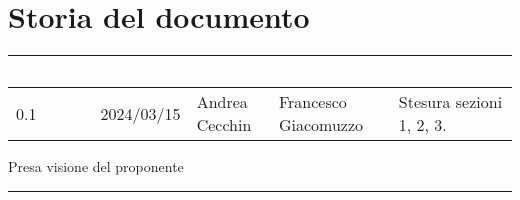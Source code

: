 \section{Storia del documento} \label{sec:storia}
\begingroup
\setlength{\tabcolsep}{10pt}
\renewcommand{\arraystretch}{1.5}
\begin{tabularx}{\textwidth}{| l | l | X | X | X |}
    \hline
    \rowcolor{headerrow} \textbf{\textcolor{white}{Versione}} & \textbf{\textcolor{white}{Data}} & \textbf{\textcolor{white}{Autori}} & \textbf{\textcolor{white}{Verificatori}} & \textbf{\textcolor{white}{Descrizione}} \\
    \hline
    0.1 & 2024/03/15 & Andrea Cecchin & Francesco Giacomuzzo & Stesura sezioni 1, 2, 3. \\
    \hline
\end{tabularx}
\endgroup
\begin{flushright}
\vspace{15pt}
Presa visione del proponente\\
\vspace{38pt}
\rule[10pt]{148pt}{0.4pt}
\end{flushright}
